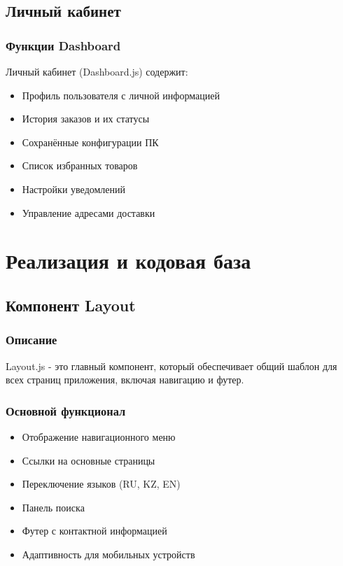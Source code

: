 \documentclass[12pt,a4paper]{report}
\begin{document}
\section{Личный кабинет}

\subsection{Функции Dashboard}
Личный кабинет (Dashboard.js) содержит:
\begin{itemize}
    \item Профиль пользователя с личной информацией
    \item История заказов и их статусы
    \item Сохранённые конфигурации ПК
    \item Список избранных товаров
    \item Настройки уведомлений
    \item Управление адресами доставки
\end{itemize}

\newpage

\chapter{Реализация и кодовая база}

\section{Компонент Layout}

\subsection{Описание}
Layout.js - это главный компонент, который обеспечивает общий шаблон для всех страниц приложения, включая навигацию и футер.

\subsection{Основной функционал}
\begin{itemize}
    \item Отображение навигационного меню
    \item Ссылки на основные страницы
    \item Переключение языков (RU, KZ, EN)
    \item Панель поиска
    \item Футер с контактной информацией
    \item Адаптивность для мобильных устройств
\end{itemize}
\end{document}

